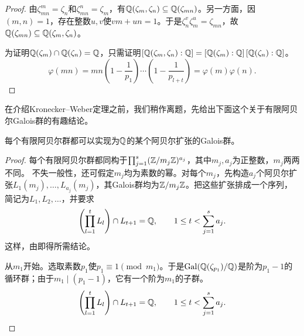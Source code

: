 \begin{proof}
由$\zeta_{mn}^{m}=\zeta_n$和$\zeta_{mn}^{n}=\zeta_m$，有$\mathbb{Q}(\zeta_m,\zeta_n)\subseteq\mathbb{Q}(\zeta_{mn})$。另一方面，因$(m,n)=1$，存在整数$u,v$使$vm+un=1$。于是$\zeta_n^v\zeta_m^u=\zeta_{mn}$，故$\mathbb{Q}(\zeta_{mn})\subseteq\mathbb{Q}(\zeta_m,\zeta_n)$。

为证明$\mathbb{Q}(\zeta_m)\cap\mathbb{Q}(\zeta_n)=\mathbb{Q}$，只需证明$[\mathbb{Q}(\zeta_m,\zeta_n):\mathbb{Q}]=[\mathbb{Q}(\zeta_m):\mathbb{Q}]\,[\mathbb{Q}(\zeta_n):\mathbb{Q}]$。
\[\varphi(mn)=mn\left(1-\frac1{p_1}\right)\cdots\left(1-\frac1{p_{l+t}}\right)=\varphi(m)\varphi(n).\]
\end{proof}
在介绍Kronecker--Weber定理之前，我们稍作离题，先给出下面这个关于有限阿贝尔Galois群的有趣结论。
\begin{theorem}\label{L1S2O6}
每个有限阿贝尔群都可以实现为$\mathbb{Q}$的某个阿贝尔扩张的Galois群。
\end{theorem}
\begin{proof}
每个有限阿贝尔群都同构于$\prod_{j=1}^s(\mathbb{Z}/m_j\mathbb{Z})^{a_j}$，其中$m_j,a_j$为正整数，$m_j$两两不同。
不失一般性，还可假定$m_j$均为素数的幂。对每个$m_j$，先构造$a_j$个阿贝尔扩张$L_1(m_j),\ldots,L_{a_j}(m_j)$，其Galois群均为$\mathbb{Z}/m_j\mathbb{Z}$。把这些扩张排成一个序列，简记为$L_1,L_2,\ldots$，并要求
\[\left(\prod_{l=1}^{t}L_l\right)\cap L_{t+1}=\mathbb{Q},\qquad 1\leq t<\sum_{j=1}^s a_j.\]
这样，由即得所需结论。

从$m_1$开始。选取素数$p_1$使$p_1\equiv1\pmod{m_1}$。于是$\operatorname{Gal}(\mathbb{Q}(\zeta_{p_1})/\mathbb{Q})$是阶为$p_1-1$的循环群；由于$m_1\mid(p_1-1)$，它有一个阶为$m_1$的子群。
\[\left(\prod_{l=1}^{t}L_l\right)\cap L_{t+1}=\mathbb{Q},\qquad1\leq t<\sum_{j=1}^s a_j.\]
\end{proof}
